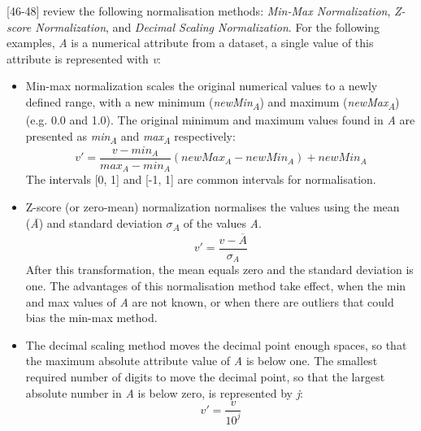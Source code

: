 \textcite{dataPreprocessingInDataMining}[46-48] review the following normalisation methods: \textit{Min-Max Normalization}, \textit{Z-score Normalization}, and \textit{Decimal Scaling Normalization}. For the following examples, \textit{A} is a numerical attribute from a dataset, a single value of this attribute is represented with \textit{v}:
\begin{itemize}
  \item Min-max normalization scales the original numerical values to a newly defined range, with a new minimum (\textit{newMin\textsubscript{A}}) and maximum (\textit{newMax\textsubscript{A}}) (e.g. 0.0 and 1.0). The original minimum and maximum values found in \textit{A} are presented as \textit{min\textsubscript{A}} and \textit{max\textsubscript{A}} respectively:
  \[
    v' = \frac{v - min_A}{max_A - min_A}(newMax_A - newMin_A) + newMin_A
  \]
  The intervals [0, 1] and [-1, 1] are common intervals for normalisation. 

  \item Z-score (or zero-mean) normalization normalises the values using the mean (\textit{\={A}}) and standard deviation \textit{$\sigma$\textsubscript{A}} of the values \textit{A}.
  \[
    v' = \frac{v - \overline{A}}{\sigma_A}
  \]
  After this transformation, the mean equals zero and the standard deviation is one. The advantages of this normalisation method take effect, when the min and max values of \textit{A} are not known, or when there are outliers that could bias the min-max method.

  \item The decimal scaling method moves the decimal point enough spaces, so that the maximum absolute attribute value of \textit{A} is below one. The smallest required number of digits to move the decimal point, so that the largest absolute number in \textit{A} is below zero, is represented by \textit{j}:
  \[
    v' = \frac{v}{10^j}
  \]
\end{itemize}





